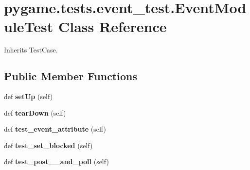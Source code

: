 \hypertarget{classpygame_1_1tests_1_1event__test_1_1_event_module_test}{}\section{pygame.\+tests.\+event\+\_\+test.\+Event\+Module\+Test Class Reference}
\label{classpygame_1_1tests_1_1event__test_1_1_event_module_test}


Inherits Test\+Case.

\subsection*{Public Member Functions}
\begin{DoxyCompactItemize}
\item 
\mbox{\label{classpygame_1_1tests_1_1event__test_1_1_event_module_test_afc95b412339e12cc8290d1890dca9bdb}} 
def {\bfseries set\+Up} (self)
\item 
\mbox{\label{classpygame_1_1tests_1_1event__test_1_1_event_module_test_a9cb533900039ec941e999584abecf2c5}} 
def {\bfseries tear\+Down} (self)
\item 
\mbox{\label{classpygame_1_1tests_1_1event__test_1_1_event_module_test_af62683ed3756769b6bd408d6608989fa}} 
def {\bfseries test\+\_\+event\+\_\+attribute} (self)
\item 
\mbox{\label{classpygame_1_1tests_1_1event__test_1_1_event_module_test_ab1d0046b89566fe56b99beb1475934be}} 
def {\bfseries test\+\_\+set\+\_\+blocked} (self)
\item 
\mbox{\label{classpygame_1_1tests_1_1event__test_1_1_event_module_test_a778696d523c28b36ce44f1e3c7c31118}} 
def {\bfseries test\+\_\+post\+\_\+\+\_\+and\+\_\+poll} (self)
\item 
\mbox{\label{classpygame_1_1tests_1_1event__test_1_1_event_module_test_a4b3cc229613043314cbd72d7a7b385b3}} 

\end{DoxyCompactItemize}
